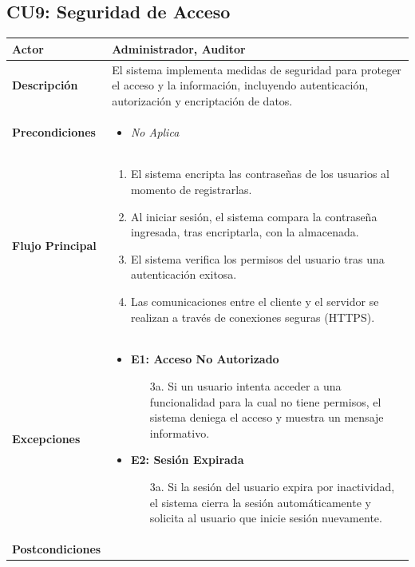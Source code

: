 \documentclass{article}
\begin{document}
\subsection{CU9: Seguridad de Acceso}
\begin{longtable}{|l|p{10cm}|}
\hline
\textbf{Actor} & Administrador, Auditor \\ \hline
\textbf{Descripción} & El sistema implementa medidas de seguridad para proteger el acceso y la información, incluyendo autenticación, autorización y encriptación de datos. \\ \hline
\textbf{Precondiciones} & 
\begin{itemize}
    \item \textit{No Aplica}
\end{itemize} \\ \hline
\textbf{Flujo Principal} & 
\begin{enumerate}
    \item El sistema encripta las contraseñas de los usuarios al momento de registrarlas.
    \item Al iniciar sesión, el sistema compara la contraseña ingresada, tras encriptarla, con la almacenada.
    \item El sistema verifica los permisos del usuario tras una autenticación exitosa.
    \item Las comunicaciones entre el cliente y el servidor se realizan a través de conexiones seguras (HTTPS).
\end{enumerate} \\ \hline
\textbf{Excepciones} & 
\begin{itemize}
    \item \textbf{E1: Acceso No Autorizado}
    \begin{enumerate}
        \item[3a.] Si un usuario intenta acceder a una funcionalidad para la cual no tiene permisos, el sistema deniega el acceso y muestra un mensaje informativo.
    \end{enumerate}
    \item \textbf{E2: Sesión Expirada}
    \begin{enumerate}
        \item[3a.] Si la sesión del usuario expira por inactividad, el sistema cierra la sesión automáticamente y solicita al usuario que inicie sesión nuevamente.
    \end{enumerate}
\end{itemize} \\ \hline
\textbf{Postcondiciones} & 

\end{longtable}
\end{document}
